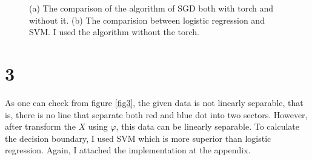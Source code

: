 \documentclass[10pt]{article}
\begin{document}
\begin{figure}[!h]
\begin{center}
{        }
        \label{fig2}
    \end{center}
    \caption{(a) The comparison of the algorithm of SGD both with torch and without it. (b) The comparision between logistic regression and SVM. I used the algorithm without the torch.}
\end{figure}


\section*{3}

As one can check from figure \ref{fig3}, the given data is not linearly separable, that is, there is no line that separate both red and blue dot into two sectors.
However, after transform the $X$ using $\varphi$, this data can be linearly separable. To calculate the decision boundary, I used SVM which is more superior than logistic regression.
Again, I attached the implementation at the appendix. 
\end{document}

